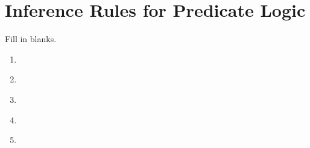 \section*{Inference Rules for Predicate Logic}

Fill in blanks.

\begin{enumerate}
 \setlength{\itemsep}{2em}

 \item

\begin{argumentN}[1]



\end{argumentN}

\item

\begin{argumentN}[1]



\end{argumentN}

\item
\begin{argumentN}[1]



\end{argumentN}

\item

\begin{argumentN}[1]





\end{argumentN}

\item 
\begin{argumentN}[1]


\end{argumentN}
\end{enumerate}
